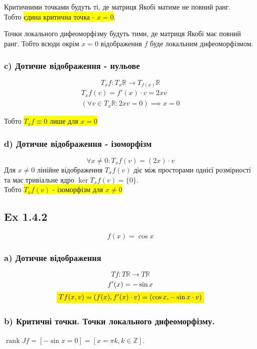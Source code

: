 \documentclass[10pt, a4paper]{article} %
\newcommand{\R}{\mathbb{R}}
\DeclareMathOperator{\rank}{rank}
\newcommand{\todo}[1]{\colorbox{red}{\textbf{TODO}: #1}}
\begin{document}
Критичними точками будуть ті, де матриця Якобі матиме не повний ранг.\\
Тобто \colorbox{yellow}{єдина критична точка - $x=0$}.

Точки локального дифеоморфізму будуть тими, де матриця Якобі має повний ранг.
Тобто всюди окрім $x=0$ відображення $f$ буде локальним дифеоморфізмом.

\subsubsection*{c) Дотичне відображення - нульове}
\[T_{x}f : T_{x}\R \to T_{f(x)}\R\]
\begin{gather*}
    T_{x}f(v) = f'(x) \cdot v = 2xv\\
    \left(\forall v\in T_{x}\R: 2xv = 0\right) \implies  x = 0
\end{gather*}

Тобто \colorbox{yellow}{$T_{x}f \equiv 0$ лише для $x=0$}

\subsubsection*{d) Дотичне відображення - ізоморфізм}

\[\forall x\ne 0: T_{x}f(v) = (2x)\cdot v\]
Для $x\ne 0$ лінійне відображення $T_{x}f(v)$ діє між просторами однієї розмірності та має тривіальне ядро $\ker T_{x}f(v) = \{0\}$. \\
Тобто \colorbox{yellow}{$T_{x}f(v)$ - ізоморфізм для $x\ne 0$}


\subsection*{Ex 1.4.2}
\begin{mdframed}
    \[f(x) = \cos x\]
\end{mdframed}

\subsubsection*{a) Дотичне відображення}
\[Tf : T\R \to T\R\]
\begin{gather*}
    f'(x) = -\sin x\\
    \colorbox{yellow}{$Tf(x,v) = (f(x), f'(x)\cdot v) = (\cos x, -\sin x \cdot v)$}
\end{gather*}

\subsubsection*{b) Критичні точки. Точки локального дифеоморфізму.}
$\rank Jf = [-\sin x = 0] = [x = \pi k, k\in\mathbb Z]$.
\end{document}
